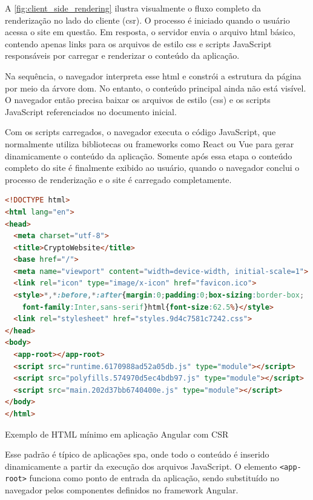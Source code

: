 A \autoref{fig:client_side_rendering} ilustra visualmente o fluxo completo da renderização no lado do cliente (\acrshort{csr}). O processo é iniciado quando o usuário acessa o site em questão. Em resposta, o servidor envia o arquivo \acrshort{html} básico, contendo apenas links para os arquivos de estilo \acrshort{css} e scripts JavaScript responsáveis por carregar e renderizar o conteúdo da aplicação.

Na sequência, o navegador interpreta esse \acrshort{html} e constrói a estrutura da página por meio da árvore \acrshort{dom}. No entanto, o conteúdo principal ainda não está visível. O navegador então precisa baixar os arquivos de estilo (\acrshort{css}) e os scripts JavaScript referenciados no documento inicial.

Com os scripts carregados, o navegador executa o código JavaScript, que normalmente utiliza bibliotecas ou frameworks como React ou Vue para gerar dinamicamente o conteúdo da aplicação. Somente após essa etapa o conteúdo completo do site é finalmente exibido ao usuário, quando o navegador conclui o processo de renderização e o site é carregado completamente.

\begin{codigo}[H]
  \begin{lstlisting}[language=html]
<!DOCTYPE html>
<html lang="en">
<head>
  <meta charset="utf-8">
  <title>CryptoWebsite</title>
  <base href="/">
  <meta name="viewport" content="width=device-width, initial-scale=1">
  <link rel="icon" type="image/x-icon" href="favicon.ico">
  <style>*,*:before,*:after{margin:0;padding:0;box-sizing:border-box;
    font-family:Inter,sans-serif}html{font-size:62.5%}</style>
  <link rel="stylesheet" href="styles.9d4c7581c7242.css">
</head>
<body>
  <app-root></app-root>
  <script src="runtime.6170988ad52a05db.js" type="module"></script>
  <script src="polyfills.574970d5ec4bdb97.js" type="module"></script>
  <script src="main.202d37bb6740400e.js" type="module"></script>
</body>
</html>
\end{lstlisting}
  \caption{Exemplo de HTML mínimo em aplicação Angular com CSR}
  \label{lst:angular_html}
\end{codigo}

Esse padrão é típico de aplicações \acrshort{spa}, onde todo o conteúdo é inserido dinamicamente a partir da execução dos arquivos JavaScript. O elemento \texttt{<app-root>} funciona como ponto de entrada da aplicação, sendo substituído no navegador pelos componentes definidos no framework Angular. {\cite{atori2024}}


